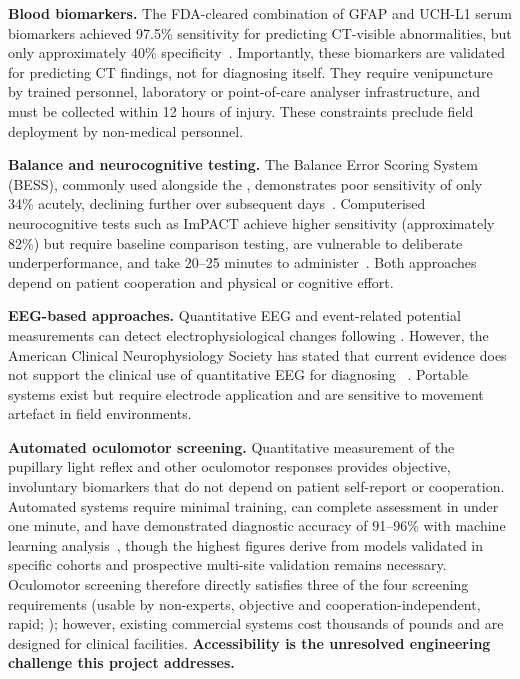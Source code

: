 \textbf{Blood biomarkers.} The FDA-cleared combination of GFAP and UCH-L1 serum biomarkers achieved 97.5\% sensitivity for predicting CT-visible abnormalities, but only approximately 40\% specificity~\cite{bazarian2018blood}. Importantly, these biomarkers are validated for predicting CT findings, not for diagnosing  itself. They require venipuncture by trained personnel, laboratory or point-of-care analyser infrastructure, and must be collected within 12 hours of injury. These constraints preclude field deployment by non-medical personnel.

\textbf{Balance and neurocognitive testing.} The Balance Error Scoring System (BESS), commonly used alongside the , demonstrates poor sensitivity of only 34\% acutely, declining further over subsequent days~\cite{bell2011bess}. Computerised neurocognitive tests such as ImPACT achieve higher sensitivity (approximately 82\%) but require baseline comparison testing, are vulnerable to deliberate underperformance, and take 20--25 minutes to administer~\cite{schatz2006impact}. Both approaches depend on patient cooperation and physical or cognitive effort.

\textbf{EEG-based approaches.} Quantitative EEG and event-related potential measurements can detect electrophysiological changes following . However, the American Clinical Neurophysiology Society has stated that current evidence does not support the clinical use of quantitative EEG for diagnosing ~\cite{nuwer2021qeeg}. Portable systems exist but require electrode application and are sensitive to movement artefact in field environments.

\noindent\textbf{Automated oculomotor screening.} Quantitative measurement of the pupillary light reflex and other oculomotor responses provides objective, involuntary biomarkers that do not depend on patient self-report or cooperation. Automated systems require minimal training, can complete assessment in under one minute, and have demonstrated diagnostic accuracy of 91--96\% with machine learning analysis~\cite{maxin2024smartphone}, though the highest figures derive from models validated in specific cohorts and prospective multi-site validation remains necessary. Oculomotor screening therefore directly satisfies three of the four screening requirements (usable by non-experts, objective and cooperation-independent, rapid; ); however, existing commercial systems cost thousands of pounds and are designed for clinical facilities. \textbf{Accessibility is the unresolved engineering challenge this project addresses.}

